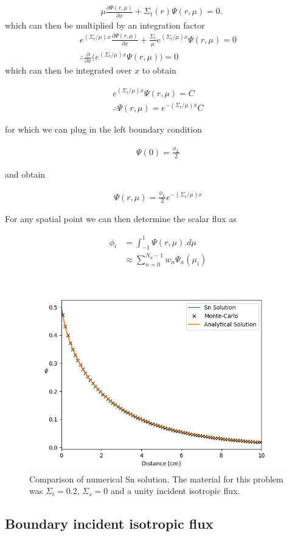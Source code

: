\documentclass[11pt,letterpaper,titlepage]{article}
\numberwithin{equation}{section}
\newcommand{\beq}{\begin{equation*}
\begin{aligned}}
\newcommand{\eeq}{\end{aligned}
\end{equation*}}
\begin{document}
\begin{equation} 
\begin{aligned}
&\mu\frac{\partial\Psi (r,\mu)}{\partial x}  + \Sigma_{t} (r)  \Psi (r,\mu)
=0.
\end{aligned}
\end{equation}
which can then be multiplied by an integration factor
\beq 
e^{(\Sigma_t/\mu) x}\frac{\partial\Psi (r,\mu)}{\partial x} +
\frac{\Sigma_t}{\mu}e^{(\Sigma_t/\mu) x}\Psi (r,\mu) 
= 0 \\
\therefore
\frac{\partial}{\partial x}
\biggr(
e^{(\Sigma_t/\mu) x}\Psi (r,\mu) 
\biggr)= 0
\eeq 
which can then be integrated over $x$ to obtain

\beq
e^{(\Sigma_t/\mu) x}\Psi (r,\mu)  = C \\
\therefore 
\Psi (r,\mu) = e^{-(\Sigma_t/\mu) x}C
\eeq 


for which we can plug in the left boundary condition

\beq
\Psi(0) = \frac{\phi_L}{2}
\eeq 

 and obtain

\beq
\Psi (r,\mu) = \frac{\phi_L}{2} e^{-(\Sigma_t/\mu) x}
\eeq 

For any spatial point we can then determine the scalar flux as

\beq
\phi_i &= \int_{-1}^1 \Psi(r,\mu).d\mu \\
&\approx \sum_{n=0}^{N_a-1} w_n \Psi_{n}(\mu_i)
\eeq 

\begin{figure}[H]
\centering
\includegraphics[width=0.7\linewidth]{images/Test_3_1}
\caption{Comparison of numerical Sn solution. The material for this problem was $\Sigma_t=0.2$, $\Sigma_s=0$ and a unity incident isotropic flux.}
\label{fig:Test_3_1}
\end{figure}


\subsection{Boundary incident isotropic flux}
\end{document}

